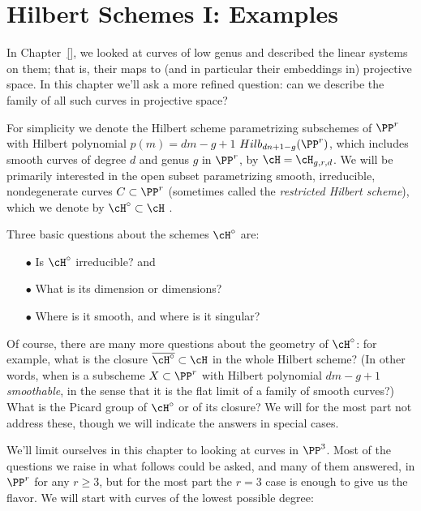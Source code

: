 

\chapter{Hilbert Schemes I: Examples}
\label{HilbertSchemesChapter}

In Chapter~\ref{}, we looked at curves of low genus and described the linear systems on them; that is, their maps to (and in particular their embeddings in) projective space. In this chapter we'll ask a more refined question: can we describe the family of all such curves in projective space?

 For simplicity we denote the Hilbert scheme parametrizing subschemes of $\PP^r$ with Hilbert polynomial $p(m) = dm-g+1$ $Hilb_{dn+1-g}(\PP^r)$, which includes smooth
curves of degree $d$ and genus $g$ in $\PP^r$, by $\cH = \cH_{g,r,d}$. We will be primarily interested in 
the open subset parametrizing smooth, irreducible, nondegenerate curves $C \subset \PP^r$ (sometimes called the \emph{restricted Hilbert scheme}), which we denote by $\cH^\circ \subset \cH$ . 


Three basic questions about the schemes $\cH^\circ$ are:

\begin{enumerate}
\item[$\bullet$] Is $\cH^\circ$ irreducible? and
\item[$\bullet$]  What is its dimension or dimensions?
\item[$\bullet$] Where is it smooth, and where is it singular?
\end{enumerate}

Of course, there are many more questions about the geometry of $\cH^\circ$: for example,  what is the closure $\overline{\cH^\circ} \subset \cH$ in the whole Hilbert scheme? (In other words, when is a subscheme $X \subset \PP^r$ with Hilbert polynomial $dm-g+1$ \emph{smoothable}, in the sense that it is the flat limit of a family of smooth curves?) What is the Picard group of $\cH^\circ$ or of its closure? We will for the most part not address these, though we will indicate the answers in special cases.

We'll limit ourselves in this chapter to looking at curves in $\PP^3$. Most of the questions we raise in what follows could be asked, and many of them answered, in $\PP^r$ for any $r \geq 3$, but for the most part the $r=3$ case is enough to give us the flavor. We will start with curves of the lowest possible degree:


